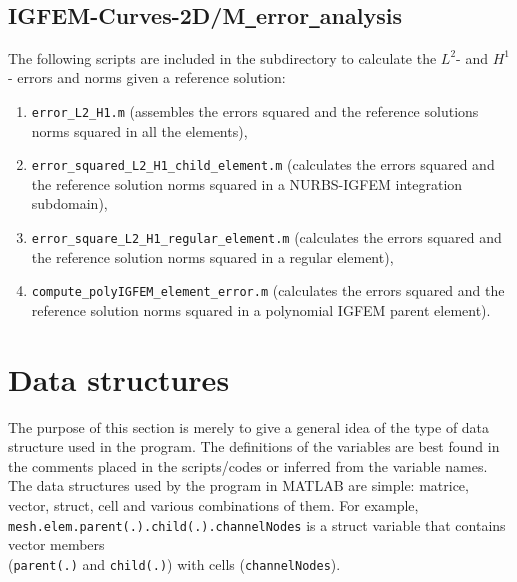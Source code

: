 \documentclass[11pt,letterpaper]{article}
\begin{document}
\subsection{IGFEM-Curves-2D/M\texttt{\_}error\texttt{\_}analysis}
\label{subsec_M_error}
The following scripts are included in the subdirectory to calculate the $L^2$- and $H^1$- errors and norms  given a reference solution:
\begin{enumerate}
\item \texttt{error\_L2\_H1.m} (assembles the errors squared and the reference solutions norms squared in all the elements),
\item \texttt{error\_squared\_L2\_H1\_child\_element.m} (calculates the errors squared and the reference solution norms squared in a NURBS-IGFEM integration subdomain),
\item \texttt{error\_square\_L2\_H1\_regular\_element.m} (calculates the errors squared and the reference solution norms squared in a regular element),
\item \texttt{compute\_polyIGFEM\_element\_error.m} (calculates the errors squared and the reference solution norms squared in a polynomial IGFEM parent element).
\end{enumerate}


\section{Data structures}
The purpose of this section is merely to give a general idea of the type of data structure used in the program. The definitions of the variables are best found in the comments placed in the scripts/codes or inferred from the variable names. The data structures used by the program in MATLAB are simple: matrice, vector, struct, cell and various combinations of them. For example, \\
\texttt{mesh.elem.parent(.).child(.).channelNodes} is  a struct variable that contains vector members \\
(\texttt{parent(.)} and \texttt{child(.)}) with cells (\texttt{channelNodes}). 
\end{document}
